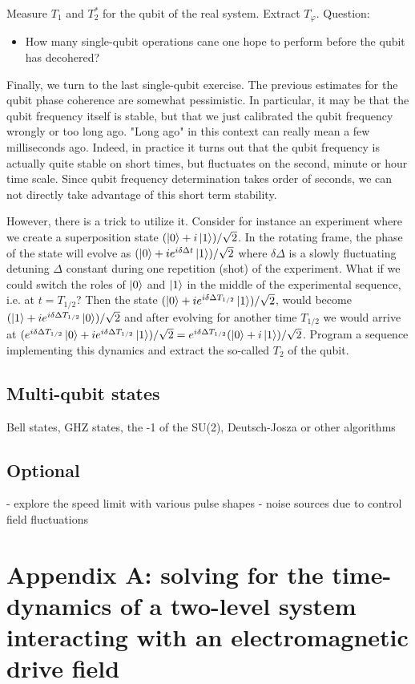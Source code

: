 \documentclass{../lab}
\begin{document}
Measure $T_1$ and $T_2^*$ for the qubit of the real system. Extract $T_\varphi$. 
Question:
\begin{itemize}
\item How many single-qubit operations cane one hope to perform before the qubit has decohered?
\end{itemize}
Finally, we turn to the last single-qubit exercise. The previous estimates for the qubit phase coherence are somewhat pessimistic. In particular, it may be that the qubit frequency itself is stable, but that we just calibrated the qubit frequency wrongly or too long ago. "Long ago" in this context can really mean a few milliseconds ago. Indeed, in practice it turns out that the qubit frequency is actually quite stable on short times, but fluctuates on the second, minute or hour time scale. Since qubit frequency determination takes order of seconds, we can not directly take advantage of this short term stability. 

However, there is a trick to utilize it. Consider for instance an experiment where we create a superposition state $(\ket{0}+i\ket{1})/\sqrt{2}$. In the rotating frame, the phase of the state will evolve as $(\ket{0}+ie^{i\delta\Delta t}\ket{1})/\sqrt{2}$ where $\delta\Delta$ is a slowly fluctuating detuning $\Delta$ constant during one repetition (shot) of the experiment. What if we could switch the roles of  $\ket{0}$ and $\ket{1}$ in the middle of the experimental sequence, i.e. at $t=T_{1/2}$? Then the state $(\ket{0}+ie^{i\delta\Delta T_{1/2}}\ket{1})/\sqrt{2}$,  would become $(\ket{1}+ie^{i\delta\Delta T_{1/2}}\ket{0})/\sqrt{2}$ and after evolving for another time $T_{1/2}$ we would arrive at $(e^{i\delta\Delta T_{1/2}}\ket{0}+ie^{i\delta\Delta T_{1/2}}\ket{1})/\sqrt{2}=e^{i\delta\Delta T_{1/2}}(\ket{0}+i\ket{1})/\sqrt{2}$. Program a sequence implementing this dynamics and extract the so-called $T_2$ of the qubit. 
\subsection{Multi-qubit states}
Bell states, GHZ states, the -1 of the SU(2), Deutsch-Josza or other algorithms
\subsection{Optional}
- explore the speed limit with various pulse shapes
- noise sources due to control field fluctuations

\section{Appendix A: solving for the time-dynamics of a two-level system interacting with an electromagnetic drive field}
\end{document}
